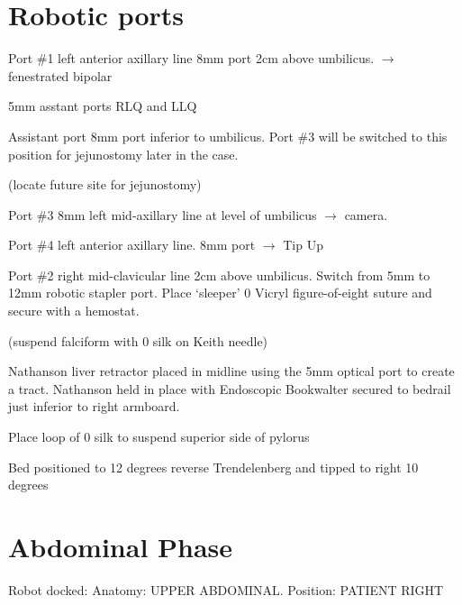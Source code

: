 \documentclass[
  letterpaper,
]{scrbook}
\begin{document}
\section{Robotic ports}\label{robotic-ports-1}

Port \#1 left anterior axillary line 8mm port 2cm above umbilicus.
\(\rightarrow\) fenestrated bipolar

5mm asstant ports RLQ and LLQ

Assistant port 8mm port inferior to umbilicus. Port \#3 will be switched
to this position for jejunostomy later in the case.

(locate future site for jejunostomy)

Port \#3 8mm left mid-axillary line at level of umbilicus
\(\rightarrow\) camera.

Port \#4 left anterior axillary line. 8mm port \(\rightarrow\) Tip Up

Port \#2 right mid-clavicular line 2cm above umbilicus. Switch from 5mm
to 12mm robotic stapler port. Place `sleeper' 0 Vicryl figure-of-eight
suture and secure with a hemostat.

(suspend falciform with 0 silk on Keith needle)

Nathanson liver retractor placed in midline using the 5mm optical port
to create a tract. Nathanson held in place with Endoscopic Bookwalter
secured to bedrail just inferior to right armboard.

Place loop of 0 silk to suspend superior side of pylorus

Bed positioned to 12 degrees reverse Trendelenberg and tipped to right
10 degrees

\section{Abdominal Phase}\label{abdominal-phase-1}

Robot docked: Anatomy: UPPER ABDOMINAL. Position: PATIENT RIGHT
\end{document}
